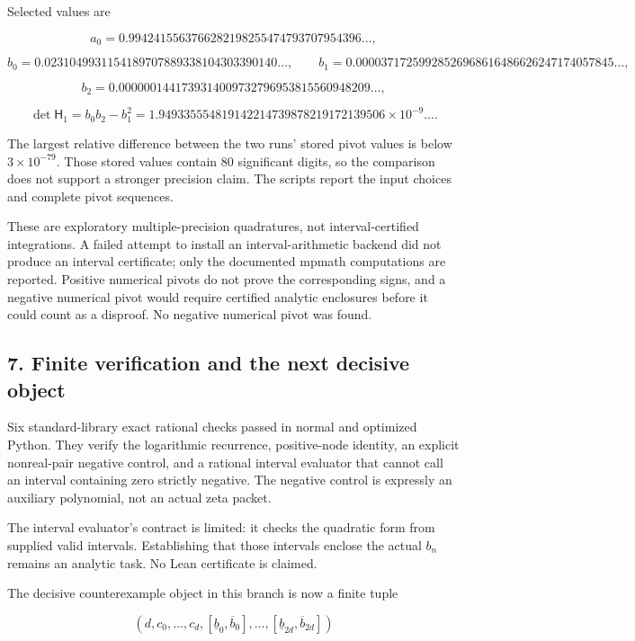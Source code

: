 \documentclass[
  11pt,
]{article}
\begin{document}
Selected values are

\[
a_0=0.9942415563766282198255474793707954396\ldots,
\]

\[
b_0=0.0231049931154189707889338104303390140\ldots,
\qquad
b_1=0.00003717259928526968616486626247174057845\ldots,
\]

\[
b_2=0.0000001441739314009732796953815560948209\ldots,
\]

\[
\det\mathsf H_1
=b_0b_2-b_1^2
=1.949335554819142214739878219172139506\times10^{-9}\ldots.
\]

The largest relative difference between the two runs' stored pivot
values is below \(3\times10^{-79}\). Those stored values contain 80
significant digits, so the comparison does not support a stronger
precision claim. The scripts report the input choices and complete pivot
sequences.

These are exploratory multiple-precision quadratures, not
interval-certified integrations. A failed attempt to install an
interval-arithmetic backend did not produce an interval certificate;
only the documented mpmath computations are reported. Positive numerical
pivots do not prove the corresponding signs, and a negative numerical
pivot would require certified analytic enclosures before it could count
as a disproof. No negative numerical pivot was found.

\subsection{7. Finite verification and the next decisive
object}\label{finite-verification-and-the-next-decisive-object}

Six standard-library exact rational checks passed in normal and
optimized Python. They verify the logarithmic recurrence, positive-node
identity, an explicit nonreal-pair negative control, and a rational
interval evaluator that cannot call an interval containing zero strictly
negative. The negative control is expressly an auxiliary polynomial, not
an actual zeta packet.

The interval evaluator's contract is limited: it checks the quadratic
form from supplied valid intervals. Establishing that those intervals
enclose the actual \(b_n\) remains an analytic task. No Lean certificate
is claimed.

The decisive counterexample object in this branch is now a finite tuple

\[
(d,c_0,\ldots,c_d,
[\underline b_0,\overline b_0],\ldots,
[\underline b_{2d},\overline b_{2d}])
\]
\end{document}
